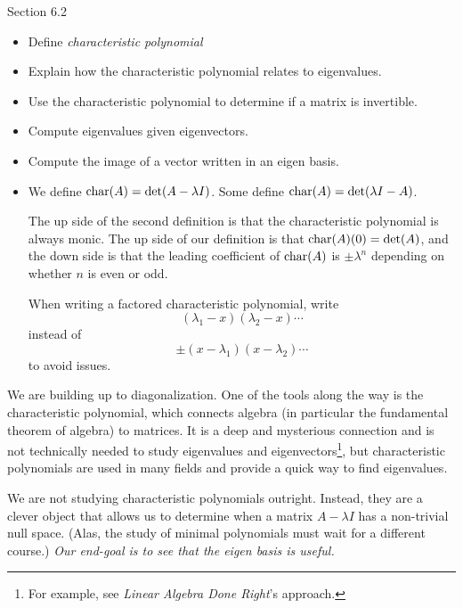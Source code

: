\documentclass{problemset}
\begin{document}
\begin{lesson}

	Section 6.2

	\begin{itemize}
		\item Define \emph{characteristic polynomial}
		\item Explain how the characteristic polynomial relates to eigenvalues.
		\item Use the characteristic polynomial to determine if a matrix is invertible.
		\item Compute eigenvalues given eigenvectors.
		\item Compute the image of a vector written in an eigen basis.
	\end{itemize}

	\begin{annotation}
		\begin{notes}
			\begin{itemize}
				\item We define $\operatorname{char}(A)=\det(A-\lambda I)$.
					Some define $\operatorname{char}(A)=\det(\lambda I-A)$.

					The up side of the second definition is
					that the characteristic polynomial is always monic.
					The up side of our definition is that
					$\operatorname{char}(A)(0)=\det(A)$, and the down side is that
					the leading coefficient of $\operatorname{char}(A)$ is $\pm\lambda^n$ depending
					on whether $n$ is even or odd.

					When writing a factored characteristic polynomial, write
					\[
						(\lambda_1-x)(\lambda_2-x)\cdots
					\]
					instead of
					\[
						\pm(x-\lambda_1)(x-\lambda_2)\cdots
					\]
					to avoid issues.
			\end{itemize}
		\end{notes}
	\end{annotation}
	We are building up to diagonalization. One of the tools along the way is the characteristic polynomial,
	which connects algebra (in particular the fundamental theorem of algebra) to matrices. It is a deep
	and mysterious connection and is not technically needed to study eigenvalues and eigenvectors\footnote{
		For example, see \emph{Linear Algebra Done Right}'s approach.}, but characteristic polynomials
	are used in many fields and provide a quick way to find eigenvalues.

	We are not studying characteristic polynomials outright. Instead, they are a clever object
	that allows us to determine when a matrix $A-\lambda I$ has a non-trivial null space. (Alas, the
	study of minimal polynomials must wait for a different course.)
	\emph{Our end-goal is to see that the eigen basis is useful.}

\end{lesson}
\end{document}
